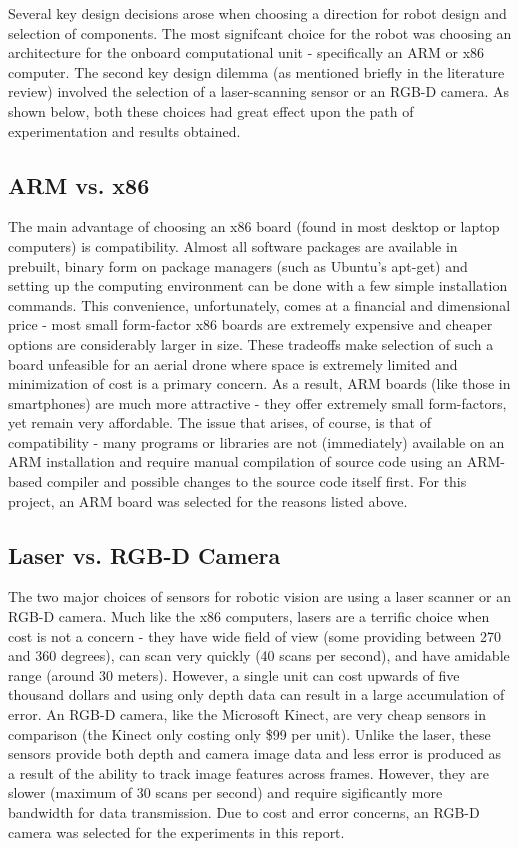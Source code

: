 \documentclass[letterpaper, oneside, 10pt]{report}
\begin{document}
Several key design decisions arose when choosing a direction for robot design and selection of components. The most signifcant choice for the robot was choosing an architecture for the onboard computational unit - specifically an ARM or x86 computer. The second key design dilemma (as mentioned briefly in the literature review) involved the selection of a laser-scanning sensor or an RGB-D camera. As shown below, both these choices had great effect upon the path of experimentation and results obtained.

\subsection{ARM vs. x86}

The main advantage of choosing an x86 board (found in most desktop or laptop computers) is compatibility. Almost all software packages are available in prebuilt, binary form on package managers (such as Ubuntu's apt-get) and setting up the computing environment can be done with a few simple installation commands. This convenience, unfortunately, comes at a financial and dimensional price - most small form-factor x86 boards are extremely expensive and cheaper options are considerably larger in size. These tradeoffs make selection of such a board unfeasible for an aerial drone where space is extremely limited and minimization of cost is a primary concern. As a result, ARM boards (like those in smartphones) are much more attractive - they offer extremely small form-factors, yet remain very affordable. The issue that arises, of course, is that of compatibility - many programs or libraries are not (immediately) available on an ARM installation and require manual compilation of source code using an ARM-based compiler and possible changes to the source code itself first. For this project, an ARM board was selected for the reasons listed above.

\subsection{Laser vs. RGB-D Camera}

The two major choices of sensors for robotic vision are using a laser scanner or an RGB-D camera. Much like the x86 computers, lasers are a terrific choice when cost is not a concern - they have wide field of view (some providing between 270 and 360 degrees), can scan very quickly (40 scans per second), and have amidable range (around 30 meters). However, a single unit can cost upwards of five thousand dollars and using only depth data can result in a large accumulation of error. An RGB-D camera, like the Microsoft Kinect, are very cheap sensors in comparison (the Kinect only costing only \$99 per unit). Unlike the laser, these sensors provide both depth and camera image data and less error is produced as a result of the ability to track image features across frames. However, they are slower (maximum of 30 scans per second) and require sigificantly more bandwidth for data transmission. Due to cost and error concerns, an RGB-D camera was selected for the experiments in this report.
\end{document}
